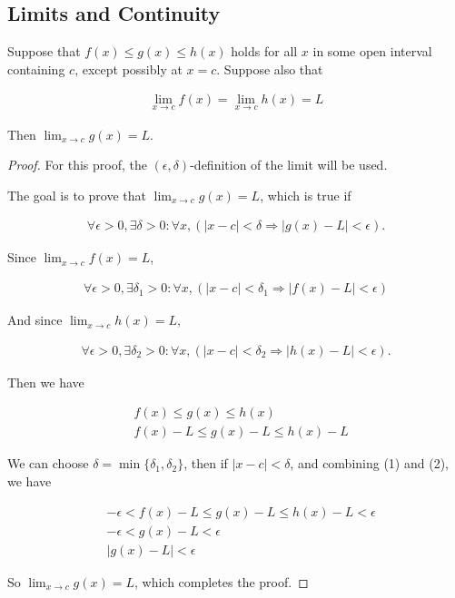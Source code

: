 \subsection{Limits and Continuity}

\begin{theorem}
	Suppose that $f(x) \leq g(x) \leq h(x)$ holds for all $x$ in some open interval containing $c$, except possibly at $x=c$. Suppose also that
	
	\begin{align*}
		\lim_{x \rightarrow c} f(x) = \lim_{x \rightarrow c} h(x) = L
	\end{align*}
	
	Then $\lim_{x \rightarrow c} g(x) = L $.
\end{theorem}

\begin{proof}
	For this proof, the $(\epsilon, \delta)$-definition of the limit will be used.
	
	The goal is to prove that $\lim_{x \rightarrow c} g(x) = L$, which is true if
	
	\begin{align*}
		\forall \epsilon > 0, \exists \delta > 0 : \forall x, (|x-c| < \delta \Rightarrow |g(x)-L| < \epsilon).
	\end{align*}
	
	Since $\lim_{x \rightarrow c} f(x) = L$,
	
	\begin{align}
		\forall \epsilon > 0, \exists \delta_1 > 0 : \forall x, (|x-c| < \delta_1 \Rightarrow |f(x)-L| < \epsilon)
	\end{align}
	
	And since $\lim_{x \rightarrow c} h(x) = L$,
	
	\begin{align}
		\forall \epsilon > 0, \exists \delta_2 > 0 : \forall x, (|x-c| < \delta_2 \Rightarrow |h(x)-L| < \epsilon).
	\end{align}
	
	Then we have 
	
	\begin{align*}
		&f(x) \leq g(x) \leq h(x) \\
		&f(x)-L \leq g(x)-L \leq h(x)-L
	\end{align*}
	
	We can choose $\delta = \min\{\delta_1, \delta_2\}$, then if $|x-c| < \delta$, and combining (1) and (2), we have
	
	\begin{align*}
		&-\epsilon < f(x)-L \leq g(x)-L \leq h(x)-L < \epsilon \\
		&-\epsilon < g(x)-L < \epsilon \\
		&|g(x)-L| < \epsilon
	\end{align*}
	
	So $\lim_{x \rightarrow c} g(x) = L$, which completes the proof.
\end{proof}

